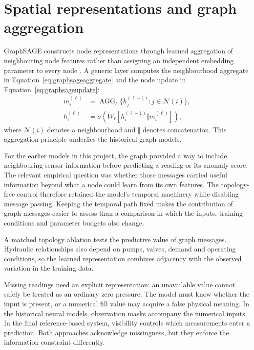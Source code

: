 \section{Spatial representations and graph aggregation}
GraphSAGE constructs node representations through learned aggregation of neighbouring node features rather than assigning an independent embedding parameter to every node \cite{graphsage}. A generic layer computes the neighbourhood aggregate in Equation~\eqref{eq:graphsageaggregate} and the node update in Equation~\eqref{eq:graphsageupdate}:
\begin{align}
 m_i^{(\ell)} &= \operatorname{AGG}_{\ell}\{h_j^{(\ell-1)}:j\in\mathcal N(i)\},\label{eq:graphsageaggregate}\\
 h_i^{(\ell)} &= \sigma\!\left(W_{\ell}[h_i^{(\ell-1)}\Vert m_i^{(\ell)}]\right),\label{eq:graphsageupdate}
\end{align}
where $\mathcal N(i)$ denotes a neighbourhood and $\Vert$ denotes concatenation. This aggregation principle underlies the historical graph models.

For the earlier models in this project, the graph provided a way to include neighbouring sensor information before predicting a reading or its anomaly score. The relevant empirical question was whether those messages carried useful information beyond what a node could learn from its own features. The topology-free control therefore retained the model's temporal machinery while disabling message passing. Keeping the temporal path fixed makes the contribution of graph messages easier to assess than a comparison in which the inputs, training conditions and parameter budgets also change.

A matched topology ablation tests the predictive value of graph messages. Hydraulic relationships also depend on pumps, valves, demand and operating conditions, so the learned representation combines adjacency with the observed variation in the training data.

Missing readings need an explicit representation: an unavailable value cannot safely be treated as an ordinary zero pressure. The model must know whether the input is present, or a numerical fill value may acquire a false physical meaning. In the historical neural models, observation masks accompany the numerical inputs. In the final reference-based system, visibility controls which measurements enter a prediction. Both approaches acknowledge missingness, but they enforce the information constraint differently.

